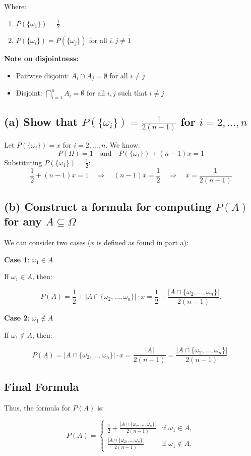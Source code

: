 \documentclass{article}
\begin{document}
\noindent Where:
\begin{enumerate}
    \item $P(\{\omega_1\}) = \frac{1}{2}$
    \item $P(\{\omega_i\}) = P(\{\omega_j\})$ for all $i, j \neq 1$
\end{enumerate}

\noindent \textbf{Note on disjointness:}
\begin{itemize}
    \item Pairwise disjoint: $A_i \cap A_j = \emptyset$ for all $i \neq j$
    \item Disjoint: $\bigcap_{i=1}^n A_i = \emptyset$ for all $i, j$ such that $i \neq j$
\end{itemize}



\subsection*{(a) Show that $P(\{\omega_i\}) = \frac{1}{2(n-1)}$ for $i = 2, \ldots, n$}
Let $P(\{\omega_i\}) = x$ for $i = 2, \ldots, n$. We know:
\[
P(\Omega) = 1 \quad \text{and} \quad P(\{\omega_1\}) + (n-1)x = 1
\]
Substituting $P(\{\omega_1\}) = \frac{1}{2}$:
\[
\frac{1}{2} + (n-1)x = 1 \quad \Rightarrow \quad (n-1)x = \frac{1}{2} \quad \Rightarrow \quad x = \frac{1}{2(n-1)}
\]

\subsection*{(b) Construct a formula for computing $P(A)$ for any $A \subseteq \Omega$}


We can consider two cases ($x$ is defined as found in part a):

\textbf{Case 1}: $\omega_1 \in A$

If $\omega_1 \in A$, then:

\[
P(A) = \frac{1}{2} + |A \cap \{\omega_2, \ldots, \omega_n\}| \cdot x = \frac{1}{2} + \frac{|A \cap \{\omega_2, \ldots, \omega_n\}|}{2(n-1)}.
\]

\textbf{Case 2}: $\omega_1 \notin A$

If $\omega_1 \notin A$, then:

\[
P(A) = |A \cap \{\omega_2, \ldots, \omega_n\}| \cdot x = \frac{|A|}{2(n-1)} = \frac{|A \cap \{\omega_2, \ldots, \omega_n\}|}{2(n-1)}.
\]

\subsection*{Final Formula}

Thus, the formula for $P(A)$ is:

\[
P(A) = 
\begin{cases} 
\frac{1}{2} + \frac{|A \cap \{\omega_2, \ldots, \omega_n\}|}{2(n-1)} & \text{if } \omega_1 \in A, \\[10pt]
\frac{|A \cap \{\omega_2, \ldots, \omega_n\}|}{2(n-1)} & \text{if } \omega_1 \notin A.
\end{cases}
\]
\end{document}
